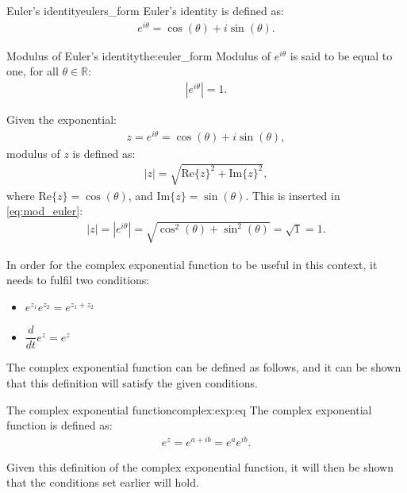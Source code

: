 \begin{definition}{Euler's identity}{eulers_form}
Euler's identity is defined as: \cite[p.~231]{diffandcomplex}
\begin{align}
e^{i\theta}=\cos(\theta)+ i \sin(\theta).
\end{align} 
\end{definition}
\begin{theorem}{Modulus of Euler's identity}{the:euler_form}
Modulus of $e^{i\theta}$ is said to be equal to one, for all $\theta \in \mathbb{R}$:
\begin{align*}
|e^{i\theta}|=1.
\end{align*}
\end{theorem}
\begin{prof}{}{}
Given the exponential:
\begin{align*}
z=e^{i\theta}=\cos(\theta)+i\sin(\theta),
\end{align*}
modulus of $z$ is defined as:
\begin{align}
|z|=\sqrt{\text{Re}\{z\}^2+\text{Im}\{z\}^2}, \label{eq:mod_euler}
\end{align}
where $\text{Re}\{z\}=\cos(\theta)$, and $\text{Im}\{z\}=\sin(\theta)$. This is inserted in \eqref{eq:mod_euler}:
\begin{align*}
|z|=|e^{i\theta}|=\sqrt{\cos^2(\theta)+\sin^2(\theta)}=\sqrt{1}=1.
\end{align*}
\end{prof}
\noindent In order for the complex exponential function to be useful in this context, it needs to fulfil two conditions:
\begin{itemize}
	\item $e^{z_1}e^{z_2} = e^{z_1 + z_2}$
	\item $\dfrac{d}{dt}e^{z} = e^{z}$
\end{itemize}
The complex exponential function can be defined as follows, and it can be shown that this definition will satisfy the given conditions.
\\

\begin{definition}{The complex exponential function}{complex:exp:eq}
The complex exponential function is defined as:
\begin{align*}
	e^{z}=e^{a+ib}=e^{a}e^{ib}.
\end{align*}
\end{definition}

\noindent
Given this definition of the complex exponential function, it will then be shown that the conditions set earlier will hold.\\

